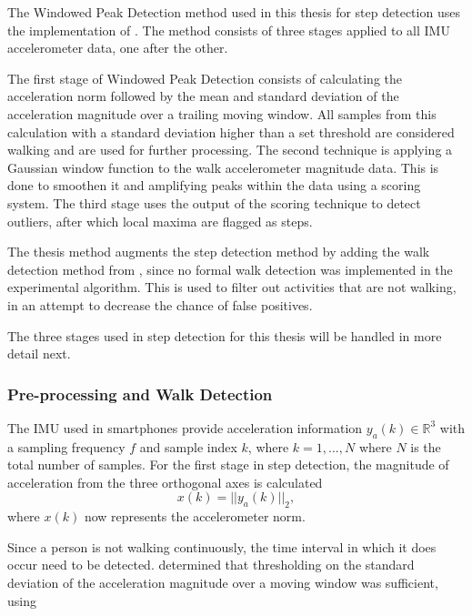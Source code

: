 The Windowed Peak Detection method used in this thesis for step detection uses the implementation of \citet{Salvi2018}. The method consists of three stages applied to all \ac{IMU} accelerometer data, one after the other. \par  
The first stage of Windowed Peak Detection consists of calculating the acceleration norm followed by the mean and standard deviation of the acceleration magnitude over a trailing moving window. All samples from this calculation with a standard deviation higher than a set threshold are considered walking and are used for further processing. The second technique is applying a Gaussian window function to the walk accelerometer magnitude data. This is done to smoothen it and amplifying peaks within the data using a scoring system. The third stage uses the output of the scoring technique to detect outliers, after which local maxima are flagged as steps.\par  

The thesis method augments the step detection method \cite{Salvi2018} by adding the walk detection method from \cite{Brajdic2013}, since no formal walk detection was implemented in the experimental algorithm. This is used to filter out activities that are not walking, in an attempt to decrease the chance of false positives.\par 

The three stages used in step detection for this thesis will be handled in more detail next.

\subsubsection{Pre-processing and Walk Detection}
	 The \ac{IMU} used in smartphones provide acceleration information  $ y_a(k) \in \mathbb{R}^3 $ with a sampling frequency $ f $ and sample index $ k $, where $ k = 1,...,N $ where $ N $ is the total number of samples. For the first stage in step detection, the magnitude of acceleration from the three orthogonal axes is calculated 
			\begin{equation}\label{key}
		x(k) = ||y_a(k)||_2,
	\end{equation} 
	where $ x(k) $ now represents the accelerometer norm. \par 
	Since a person is not walking continuously, the time interval in which it does occur need to be detected. \citet{Brajdic2013} determined that thresholding on the standard deviation of the acceleration magnitude over a moving window was sufficient, using 
	
